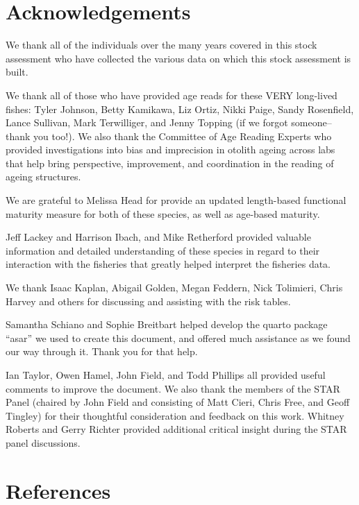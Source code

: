 \documentclass[
]{article}
\begin{document}
\newpage{}

\newpage{}

\section{Acknowledgements}\label{sec-acknowledgements}

We thank all of the individuals over the many years covered in this
stock assessment who have collected the various data on which this stock
assessment is built.

We thank all of those who have provided age reads for these VERY
long-lived fishes: Tyler Johnson, Betty Kamikawa, Liz Ortiz, Nikki
Paige, Sandy Rosenfield, Lance Sullivan, Mark Terwilliger, and Jenny
Topping (if we forgot someone-- thank you too!). We also thank the
Committee of Age Reading Experts who provided investigations into bias
and imprecision in otolith ageing across labs that help bring
perspective, improvement, and coordination in the reading of ageing
structures.

We are grateful to Melissa Head for provide an updated length-based
functional maturity measure for both of these species, as well as
age-based maturity.

Jeff Lackey and Harrison Ibach, and Mike Retherford provided valuable
information and detailed understanding of these species in regard to
their interaction with the fisheries that greatly helped interpret the
fisheries data.

We thank Isaac Kaplan, Abigail Golden, Megan Feddern, Nick Tolimieri,
Chris Harvey and others for discussing and assisting with the risk
tables.

Samantha Schiano and Sophie Breitbart helped develop the quarto package
``asar'' we used to create this document, and offered much assistance as
we found our way through it. Thank you for that help.

Ian Taylor, Owen Hamel, John Field, and Todd Phillips all provided
useful comments to improve the document. We also thank the members of
the STAR Panel (chaired by John Field and consisting of Matt Cieri,
Chris Free, and Geoff Tingley) for their thoughtful consideration and
feedback on this work. Whitney Roberts and Gerry Richter provided
additional critical insight during the STAR panel discussions.

\newpage{}

\section{References}\label{references}
\end{document}
